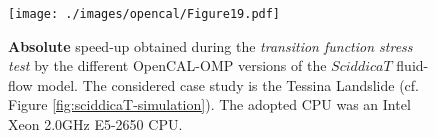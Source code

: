 \begin{figure}
	\begin{center}
		\texttt{[image: ./images/opencal/Figure19.pdf]}
		\caption[\textbf{Absolute} speed-up obtained during the \emph{transition function stress test} by the different OpenCAL-OMP versions of the $SciddicaT$
		fluid-flow model.]{\textbf{Absolute} speed-up obtained during the \emph{transition function stress test} by the different OpenCAL-OMP versions of the $SciddicaT$
			fluid-flow model. The considered case study is the Tessina Landslide
			(cf. Figure \ref{fig:sciddicaT-simulation}). The adopted CPU was an
			Intel Xeon 2.0GHz E5-2650 CPU.}
		\label{gr:sciddicaT-OMP-absolute-speed-up-stress}
	\end{center}
\end{figure}


